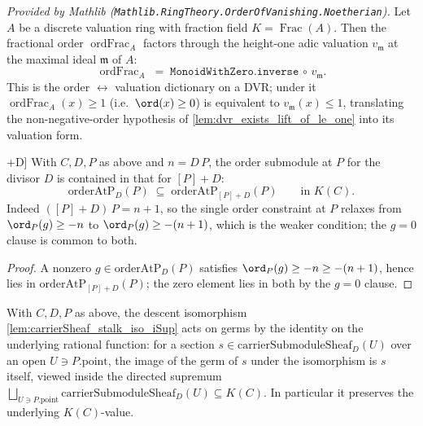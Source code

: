 \begin{lemma}
  \label{lem:ordFrac_eq_inverse_valuation}
  \mathlibok
  \textit{Provided by Mathlib
  (\texttt{Mathlib.RingTheory.OrderOfVanishing.Noetherian}).}
  Let \(A\) be a discrete valuation ring with fraction field
  \(K = \operatorname{Frac}(A)\). Then the fractional order
  \(\operatorname{ordFrac}_A\) factors through the height-one adic valuation
  \(v_{\mathfrak m}\) at the maximal ideal \(\mathfrak m\) of \(A\):
  \[
    \operatorname{ordFrac}_A \;=\;
    \texttt{MonoidWithZero.inverse} \,\circ\, v_{\mathfrak m}.
  \]
  This is the order \(\leftrightarrow\) valuation dictionary on a DVR; under it
  \(\operatorname{ordFrac}_A(x) \ge 1\) (i.e.\ \(\ord(x) \ge 0\)) is equivalent
  to \(v_{\mathfrak m}(x) \le 1\), translating the non-negative-order hypothesis
  of \cref{lem:dvr_exists_lift_of_le_one} into its valuation form.
\end{lemma}

\begin{lemma}\leanok
[Order submodule is monotone under \(D \rightsquigarrow [P]+D\)]
  \label{lem:orderAtPSubmodule_le_single_add}
  With \(C, D, P\) as above and \(n = D\,P\), the order submodule at \(P\) for
  the divisor \(D\) is contained in that for \([P]+D\):
  \[
    \mathrm{orderAtP}_D(P) \;\subseteq\; \mathrm{orderAtP}_{[P]+D}(P)
    \qquad\text{in } K(C).
  \]
  Indeed \(([P]+D)\,P = n+1\), so the single order constraint at \(P\) relaxes
  from \(\ord_P(g) \ge -n\) to \(\ord_P(g) \ge -(n+1)\), which is the weaker
  condition; the \(g = 0\) clause is common to both.
\end{lemma}

\begin{proof}
  A nonzero \(g \in \mathrm{orderAtP}_D(P)\) satisfies \(\ord_P(g) \ge -n \ge
  -(n+1)\), hence lies in \(\mathrm{orderAtP}_{[P]+D}(P)\); the zero element lies
  in both by the \(g = 0\) clause.
\end{proof}

\begin{lemma}
  \label{lem:carrierSheaf_stalk_iso_iSup_germ_coe}
  With \(C, D, P\) as above, the descent isomorphism
  \cref{lem:carrierSheaf_stalk_iso_iSup} acts on germs by the identity on the
  underlying rational function: for a section
  \(s \in \mathrm{carrierSubmoduleSheaf}_D(U)\) over an open
  \(U \ni P.\mathrm{point}\), the image of the germ of \(s\) under the
  isomorphism is \(s\) itself, viewed inside the directed supremum
  \(\bigsqcup_{U \ni P.\mathrm{point}} \mathrm{carrierSubmoduleSheaf}_D(U)
  \subseteq K(C)\). In particular it preserves the underlying \(K(C)\)-value.
\end{lemma}

